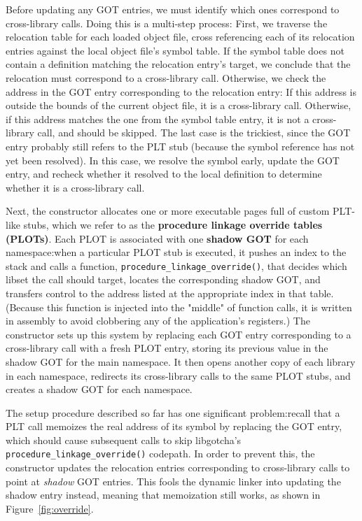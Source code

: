 Before updating any GOT entries, we must identify
which ones correspond to cross-library calls.  Doing this is a multi-step process:
First, we traverse the relocation table for each loaded object file, cross
referencing each of its relocation entries against the local object file's symbol
table.  If the symbol table does not contain a definition matching the relocation
entry's target, we conclude that the relocation must correspond to a cross-library
call.  Otherwise, we check the address in the GOT entry corresponding to the
relocation entry:  If this address is outside the bounds of the current object file,
it is a cross-library call.  Otherwise, if this address matches the one from the
symbol table entry, it is not a cross-library call, and should be skipped.  The last
case is the trickiest, since the GOT entry probably still refers to the PLT stub
(because the symbol reference has not yet been resolved).  In this case, we resolve
the symbol
early, update the GOT entry, and recheck whether it resolved to the local definition
to determine whether it is a cross-library call.

Next, the constructor allocates one or more executable pages full of custom PLT-like
stubs, which we refer to as the \textbf{procedure linkage override tables (PLOTs)}.
Each PLOT is associated with one \textbf{shadow GOT} for each namespace:\@ when a
particular PLOT stub is executed, it pushes an index to the stack and calls a
function, \texttt{procedure\_linkage\_override()}, that decides which libset the call
should target, locates the corresponding shadow GOT, and transfers control to the
address listed at the appropriate index in that table.  (Because this function
is injected into the "middle" of function calls, it is written in assembly to avoid
clobbering any of the application's registers.)  The constructor sets up this system
by replacing each GOT entry corresponding to a cross-library call with a fresh PLOT
entry, storing its previous value in the shadow GOT for the main namespace.  It
then opens another copy of each library in each namespace, redirects its
cross-library calls to the same PLOT stubs, and creates a shadow GOT for each
namespace.

The setup procedure described so far has one significant problem:\@ recall that a PLT
call memoizes the real address of its symbol by replacing the GOT entry, which should
cause subsequent calls to skip libgotcha's \texttt{procedure\_linkage\_override()}
codepath.  In order to prevent this, the constructor updates the relocation entries
corresponding to cross-library calls to point at \textit{shadow} GOT entries.  This
fools the dynamic linker into updating the shadow entry instead, meaning that
memoization still works, as shown in Figure~\ref{fig:override}.

